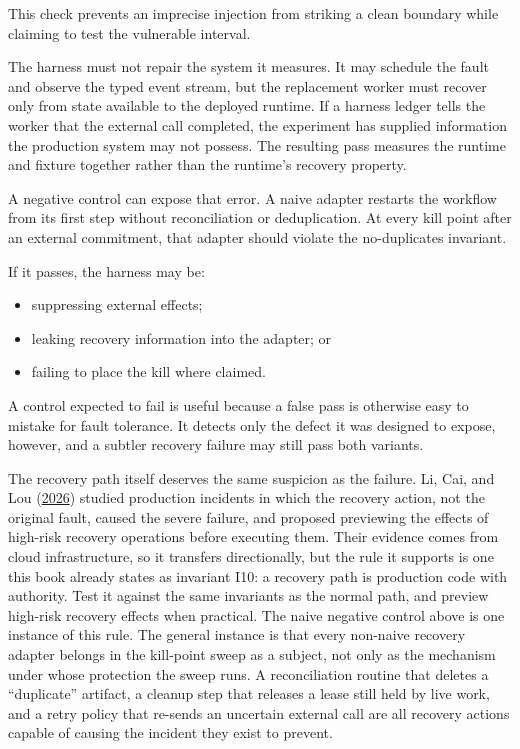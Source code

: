 This check prevents an imprecise injection from striking a clean boundary while claiming to test the vulnerable interval.

The harness must not repair the system it measures. It may schedule the fault and observe the typed event stream, but the replacement worker must recover only from state available to the deployed runtime. If a harness ledger tells the worker that the external call completed, the experiment has supplied information the production system may not possess. The resulting pass measures the runtime and fixture together rather than the runtime's recovery property.

A negative control can expose that error. A naive adapter restarts the workflow from its first step without reconciliation or deduplication. At every kill point after an external commitment, that adapter should violate the no-duplicates invariant.


If it passes, the harness may be:

\begin{itemize}
\tightlist
\item
  suppressing external effects;
\item
  leaking recovery information into the adapter; or
\item
  failing to place the kill where claimed.
\end{itemize}

A control expected to fail is useful because a false pass is otherwise easy to mistake for fault tolerance. It detects only the defect it was designed to expose, however, and a subtler recovery failure may still pass both variants.

The recovery path itself deserves the same suspicion as the failure. Li, Cai, and Lou (\href{https://www.usenix.org/conference/nsdi26/presentation/li-zhenyu}{2026}) studied production incidents in which the recovery action, not the original fault, caused the severe failure, and proposed previewing the effects of high-risk recovery operations before executing them. Their evidence comes from cloud infrastructure, so it transfers directionally, but the rule it supports is one this book already states as invariant I10: a recovery path is production code with authority. Test it against the same invariants as the normal path, and preview high-risk recovery effects when practical. The naive negative control above is one instance of this rule. The general instance is that every non-naive recovery adapter belongs in the kill-point sweep as a subject, not only as the mechanism under whose protection the sweep runs. A reconciliation routine that deletes a ``duplicate'' artifact, a cleanup step that releases a lease still held by live work, and a retry policy that re-sends an uncertain external call are all recovery actions capable of causing the incident they exist to prevent.

